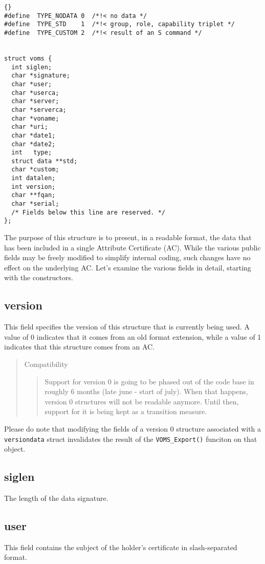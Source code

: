 \documentclass[a4paper]{book}
\newenvironment{compatibility}{\begin{quote}\color{red}Compatibility\begin{quote}}{\end{quote}\color{black}\end{quote}}
\begin{document}
{\begin{lstlisting}{}
#define  TYPE_NODATA 0  /*!< no data */
#define  TYPE_STD    1  /*!< group, role, capability triplet */
#define  TYPE_CUSTOM 2  /*!< result of an S command */


struct voms {
  int siglen;       
  char *signature;  
  char *user;       
  char *userca;     
  char *server;     
  char *serverca;   
  char *voname;     
  char *uri;        
  char *date1;      
  char *date2;      
  int   type;       
  struct data **std;
  char *custom;     
  int datalen;
  int version;
  char **fqan;
  char *serial;     
  /* Fields below this line are reserved. */
};
\end{lstlisting}}

The purpose of this structure is to present, in a readable format, the
data that has been included in a single Attribute Certificate
(AC).  While the various public fields may be freely modified to
simplify internal coding, such changes have no effect on the
underlying AC.  Let's examine the various fields in detail, starting
with the constructors.

\subsection{version}
This field specifies the version of this structure that is currently
being used.  A value of 0 indicates that it comes from an old format
extension, while a value of 1 indicates that this structure comes from
an AC.

\begin{compatibility}
Support for version 0 is going to be phased out of the code base in
roughly 6 months (late june - start of july).  When that happens,
version 0 structures will not be readable anymore. Until then, support
for it is being kept as a transition measure.
\end{compatibility}

Please do note that modifying the fields of a version 0 structure
associated with a \verb|versiondata| struct invalidates the result of
the \verb|VOMS_Export()| funciton on that object.

\subsection{siglen}
The length of the data signature.

\subsection{user}
This field contains the subject of the holder's certificate in
slash-separated format.
\end{document}
